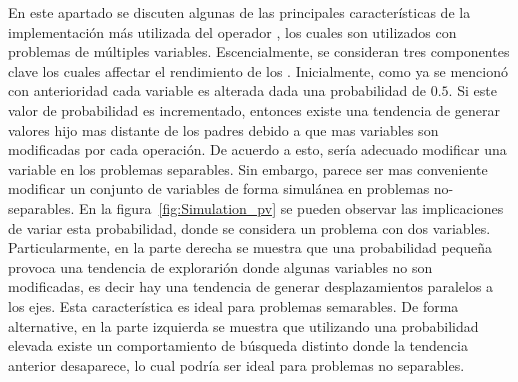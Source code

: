 En este apartado se discuten algunas de las principales características de la implementación más utilizada del operador \SBX{}, los cuales son utilizados con problemas de múltiples variables.
%
Escencialmente, se consideran tres componentes clave los cuales affectar el rendimiento de los \MOEAS{}.
%
Inicialmente, como ya se mencionó con anterioridad cada variable es alterada dada una probabilidad de $0.5$.
%
Si este valor de probabilidad es incrementado, entonces existe una tendencia de generar valores hijo mas distante de los padres debido a que mas variables son modificadas por cada operación.
%
De acuerdo a esto, sería adecuado modificar una variable en los problemas separables.
%
Sin embargo, parece ser mas conveniente modificar un conjunto de variables de forma simulánea en problemas no-separables.
%
En la figura~\ref{fig:Simulation_pv} se pueden observar las implicaciones de variar esta probabilidad, donde se considera un problema con dos variables.
%
Particularmente, en la parte derecha se muestra que una probabilidad pequeña provoca una tendencia de explorarión donde algunas variables no son modificadas, es decir hay una tendencia de generar desplazamientos paralelos a los ejes.
%
Esta característica es ideal para problemas semarables.
%
De forma alternative, en la parte izquierda se muestra que utilizando una probabilidad elevada existe un comportamiento de búsqueda distinto donde la tendencia anterior desaparece, lo cual podría ser ideal para problemas no separables.
